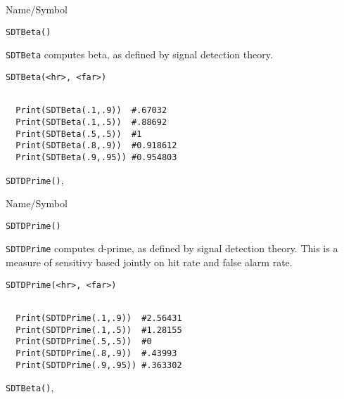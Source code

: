 \rl


\begin{desc}{Name/Symbol}
\item[Name/Symbol] 	\verb+SDTBeta()+

\item[Description] \verb+SDTBeta+ computes beta, as defined by signal detection theory.  

\item[Usage]        	
\begin{verbatim}
SDTBeta(<hr>, <far>)
\end{verbatim}

\item[Example] 	
\begin{verbatim}

  Print(SDTBeta(.1,.9))  #.67032
  Print(SDTBeta(.1,.5))  #.88692
  Print(SDTBeta(.5,.5))  #1
  Print(SDTBeta(.8,.9))  #0.918612
  Print(SDTBeta(.9,.95)) #0.954803
\end{verbatim}

\item[See Also]\verb+SDTDPrime()+,
\end{desc}

\rl

\begin{desc}{Name/Symbol}
\item[Name/Symbol] 	\verb+SDTDPrime()+

\item[Description] \verb+SDTDPrime+ computes d-prime, as defined by
signal detection theory.  This is a measure of sensitivy based jointly
on hit rate and false alarm rate.

\item[Usage]        	
\begin{verbatim}
SDTDPrime(<hr>, <far>)
\end{verbatim}

\item[Example] 	
\begin{verbatim}

  Print(SDTDPrime(.1,.9))  #2.56431
  Print(SDTDPrime(.1,.5))  #1.28155
  Print(SDTDPrime(.5,.5))  #0
  Print(SDTDPrime(.8,.9))  #.43993
  Print(SDTDPrime(.9,.95)) #.363302

\end{verbatim}

\item[See Also]\verb+SDTBeta()+,
\end{desc}

\rl




